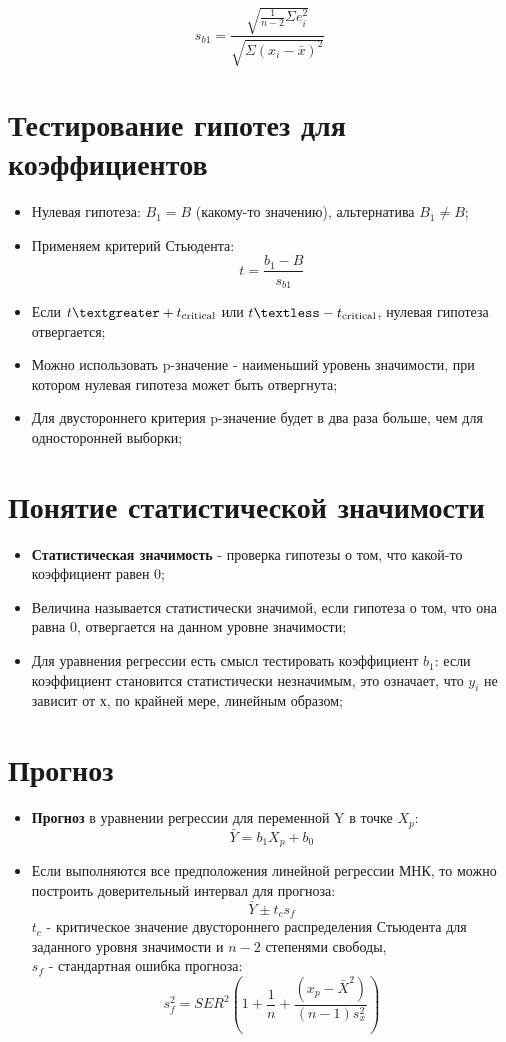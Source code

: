 \documentclass{article}
\begin{document}
\[s_{b1} = \frac{\sqrt {\frac{1}{n-2}\Sigma e_i^2}}{\sqrt{\Sigma (x_i - \bar{x})^2}}\]

\section{Тестирование гипотез для коэффициентов}\label{sec:testing}
\begin{itemize}
    \item Нулевая гипотеза: \(B_1 = B \) (какому-то значению), альтернатива \(B_1 \neq B \);
    \item Применяем критерий Стьюдента: 
    \[t = \frac{b_1 - B}{s_{b1}} \]
    \item Если \(t \textgreater +t\textsubscript{critical} \) или \(t \textless -t\textsubscript{critical} \), нулевая гипотеза отвергается;
    \item  Можно использовать p-значение - наименьший уровень значимости, при котором нулевая гипотеза может быть отвергнута;
    \item  Для двустороннего критерия p-значение будет в два раза больше, чем для односторонней выборки;
\end{itemize}

\section{Понятие статистической значимости}\label{sec:stat-sign}
\begin{itemize}
    \item \textbf{Статистическая значимость} - проверка гипотезы о том, что какой-то коэффициент равен 0;
    \item Величина называется статистически значимой, если гипотеза о том, что она равна 0, отвергается на данном уровне значимости;
    \item Для уравнения регрессии есть смысл тестировать коэффициент \(b_1\): если коэффициент становится статистически незначимым, это означает, что \(y_i\) не зависит от х, по крайней мере, линейным образом;
\end{itemize}

\section{Прогноз}\label{sec:forc}
\begin{itemize}
    \item \textbf{Прогноз} в уравнении регрессии для переменной Y в точке \(X_p\):
    \[\bar{Y} = b_1X_p + b_0 \]
    \item Если выполняются все предположения линейной регрессии МНК, то можно построить доверительный интервал для прогноза: 
    \[\bar{Y} \pm t_cs_f \]
    \(t_c\) - критическое значение двустороннего распределения Стьюдента для заданного уровня значимости и \(n-2 \) степенями свободы, \\
    \(s_f\) - стандартная ошибка прогноза:
    \[s_f^2 = SER^2(1 + \frac{1}{n} + \frac{(x_p - \bar{X}^2)}{(n-1)s_x^2}) \]
\end{itemize}
\end{document}
